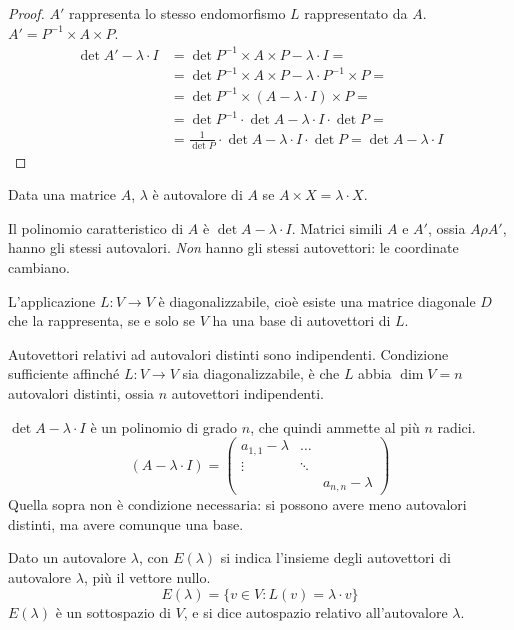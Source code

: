 \begin{proof}
$A'$ rappresenta lo stesso endomorfismo $L$ rappresentato da $A$. $A' = P^{-1} \times A \times P$.
\begin{align*}
\det{A' - \lambda \cdot I} &= \det{ P^{-1} \times A \times P - \lambda \cdot I} = \\
&= \det{P^{-1} \times A \times P - \lambda \cdot P^{-1} \times P} = \tag{si pu\`o mettere in evidenza} \\
&= \det{P^{-1} \times (A - \lambda \cdot I) \times P} = \tag{per Binet} \\
&= \det{P^{-1}} \cdot \det{A - \lambda \cdot I} \cdot \det{P} = \\
&= \frac{1}{\det{P}} \cdot \det{A - \lambda \cdot I} \cdot \det{P} =
\det{A - \lambda \cdot I}
\end{align*}
\end{proof}

Data una matrice $A$, $\lambda$ \`e autovalore di $A$ se $A \times X = \lambda \cdot X$.

Il polinomio caratteristico di $A$ \`e $\det{A - \lambda \cdot I}$. Matrici simili $A$ e $A'$, ossia $A \rho A'$, hanno gli stessi autovalori. \emph{Non} hanno gli stessi autovettori: le coordinate cambiano.

L'applicazione $L : V \to V$ \`e diagonalizzabile, cio\`e esiste una matrice diagonale $D$ che la rappresenta, se e solo se $V$ ha una base di autovettori di $L$.

Autovettori relativi ad autovalori distinti sono indipendenti. Condizione sufficiente affinch\'e $L : V \to V$ sia diagonalizzabile, \`e che $L$ abbia $\dim V = n$ autovalori distinti, ossia $n$ autovettori indipendenti.

$\det{A - \lambda \cdot I}$ \`e un polinomio di grado $n$, che quindi ammette al pi\`u $n$ radici.
\[
(A - \lambda \cdot I) =
\begin{pmatrix}
a_{1,1} - \lambda & \dots & \\
\vdots & \ddots & \\
& & a_{n,n} - \lambda
\end{pmatrix}
\]
Quella sopra non \`e condizione necessaria: si possono avere meno autovalori distinti, ma avere comunque una base.

Dato un autovalore $\lambda$, con $E(\lambda)$ si indica l'insieme degli autovettori di autovalore $\lambda$, pi\`u il vettore nullo.
\[
E(\lambda) = \{ v \in V : L(v) = \lambda \cdot v \}
\]
$E(\lambda)$ \`e un sottospazio di $V$, e si dice autospazio relativo all'autovalore $\lambda$.

